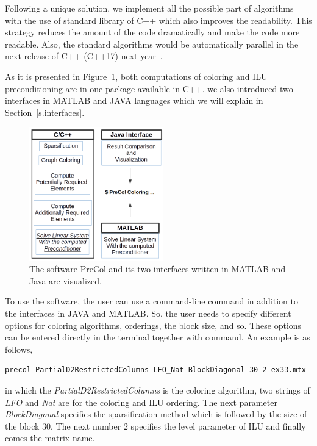 \documentclass[12pt, twoside,a4paper,toc=bibliography]{scrbook}
\newcommand{\figref}[1]{Figure~\protect\ref{#1}}
\begin{document}
Following a unique solution, we implement all the possible part of algorithms
with the use of standard library of C++ which also improves the readability.
This strategy reduces the amount of the code dramatically and
make the code more readable.
Also, the standard algorithms would be automatically parallel in the next
release of C++ (C++17) next year~\cite{parallelcpp}.

As it is presented in \figref{f.structure}, both computations of coloring and ILU preconditioning
are in one package available in C++. we also introduced
two interfaces in MATLAB and JAVA languages which we will explain in
Section~\ref{s.interfaces}.
\begin{figure}
\centering
\includegraphics[width=0.52\textwidth]{new_struct}
\caption{
The software PreCol and its two interfaces written in MATLAB and Java are visualized.}
\label{f.structure}
\end{figure}

To use the software, the user can use a command-line command in addition to
the interfaces in JAVA and MATLAB. So, the user needs to specify different
options for coloring algorithms, orderings, the block size, and so.
These options can be entered directly in the terminal together with command.
An example is as follows,
\begin{lstlisting}
precol PartialD2RestrictedColumns LFO_Nat BlockDiagonal 30 2 ex33.mtx
\end{lstlisting}
in which the \textit{PartialD2RestrictedColumns} is the coloring algorithm,
two strings of \textit{LFO} and \textit{Nat} are for the coloring and ILU ordering.
The next parameter \textit{BlockDiagonal} specifies the sparsification method
which is followed by the size of the block $30$. The next number $2$ specifies
the level parameter of ILU and finally comes the matrix name.
\end{document}
